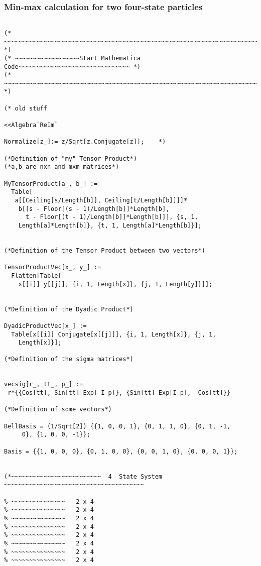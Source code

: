 \documentclass[%
 showpacs,
 showkeys,
 preprintnumbers,
 amsmath,amssymb,
 aps,
  pra,
  longbibliography,
 floatfix,
 ]{revtex4-1}
\begin{document}
\subsubsection{Min-max calculation for two four-state particles}

{ \begin{lstlisting}[backgroundcolor=\color{yellow!10},framerule=0pt,breaklines=true, frame=tb]

(* ~~~~~~~~~~~~~~~~~~~~~~~~~~~~~~~~~~~~~~~~~~~~~~~~~~~~~~~~~~~~~~~~~~~~~~~ *)
(* ~~~~~~~~~~~~~~~~~~Start Mathematica Code~~~~~~~~~~~~~~~~~~~~~~~~~~~~~~~ *)
(* ~~~~~~~~~~~~~~~~~~~~~~~~~~~~~~~~~~~~~~~~~~~~~~~~~~~~~~~~~~~~~~~~~~~~~~~ *)

(* old stuff

<<Algebra`ReIm`

Normalize[z_]:= z/Sqrt[z.Conjugate[z]];    *)

(*Definition of "my" Tensor Product*)
(*a,b are nxn and mxm-matrices*)

MyTensorProduct[a_, b_] :=
  Table[
   a[[Ceiling[s/Length[b]], Ceiling[t/Length[b]]]]*
    b[[s - Floor[(s - 1)/Length[b]]*Length[b],
      t - Floor[(t - 1)/Length[b]]*Length[b]]], {s, 1,
    Length[a]*Length[b]}, {t, 1, Length[a]*Length[b]}];


(*Definition of the Tensor Product between two vectors*)

TensorProductVec[x_, y_] :=
  Flatten[Table[
    x[[i]] y[[j]], {i, 1, Length[x]}, {j, 1, Length[y]}]];


(*Definition of the Dyadic Product*)

DyadicProductVec[x_] :=
  Table[x[[i]] Conjugate[x[[j]]], {i, 1, Length[x]}, {j, 1,
    Length[x]}];

(*Definition of the sigma matrices*)


vecsig[r_, tt_, p_] :=
 r*{{Cos[tt], Sin[tt] Exp[-I p]}, {Sin[tt] Exp[I p], -Cos[tt]}}

(*Definition of some vectors*)

BellBasis = (1/Sqrt[2]) {{1, 0, 0, 1}, {0, 1, 1, 0}, {0, 1, -1,
     0}, {1, 0, 0, -1}};

Basis = {{1, 0, 0, 0}, {0, 1, 0, 0}, {0, 0, 1, 0}, {0, 0, 0, 1}};


(*~~~~~~~~~~~~~~~~~~~~~~~~~  4  State System ~~~~~~~~~~~~~~~~~~~~~~~~~~~~~~~~~~~~~~~

% ~~~~~~~~~~~~~~~   2 x 4
% ~~~~~~~~~~~~~~~   2 x 4
% ~~~~~~~~~~~~~~~   2 x 4
% ~~~~~~~~~~~~~~~   2 x 4
% ~~~~~~~~~~~~~~~   2 x 4
% ~~~~~~~~~~~~~~~   2 x 4
% ~~~~~~~~~~~~~~~   2 x 4
% ~~~~~~~~~~~~~~~   2 x 4


\end{lstlisting}}
\end{document}
